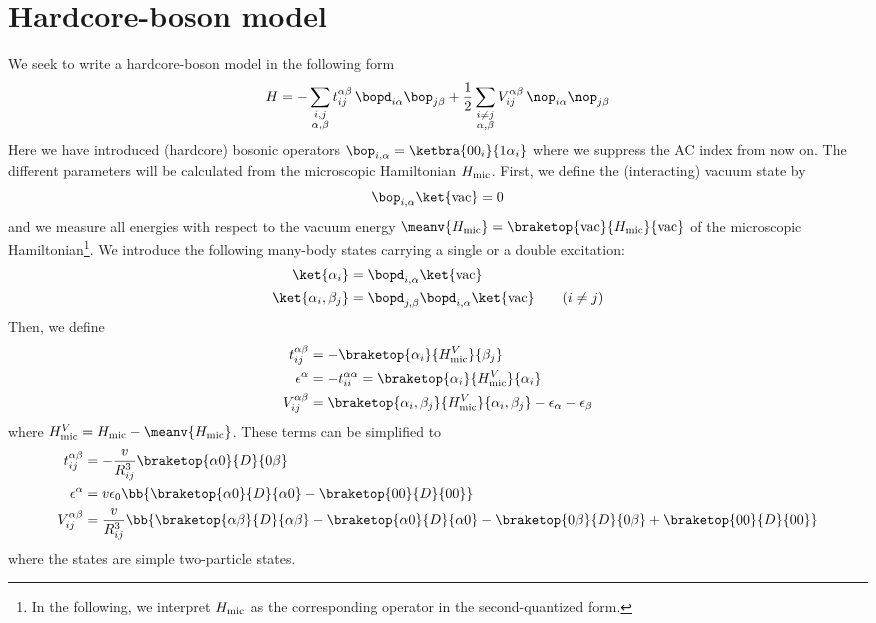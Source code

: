 \section{Hardcore-boson model}
We seek to write a hardcore-boson model in the following form
\begin{align}
    H=%
    - \sum_{\substack{i, j\\ \alpha,\beta}} t_{ij}^{\alpha\beta}\, \bopd_{i\alpha} \bop_{j\beta}
    + \frac{1}{2} \sum_{\substack{i\ne j\\ \alpha,\beta}} V_{ij}^{\alpha\beta}\,  \nop_{i\alpha} \nop_{j\beta}
\end{align}
Here we have introduced (hardcore) bosonic operators $\bop_{i,\alpha} =
\ketbra{00_i}{1\alpha_i}$ where we suppress the AC index from now on.
The different parameters will be calculated from the microscopic Hamiltonian $H_\text{mic}$.
First, we define the (interacting) vacuum state by
\begin{align}
    \bop_{i,\alpha}\ket{\text{vac}}=0
\end{align}
and we measure all energies with respect to the vacuum energy
$\meanv{\Hmic}=\braketop{\text{vac}}{\Hmic}{\text{vac}}$ of the
microscopic Hamiltonian\footnote{In the following, we interpret $H_\text{mic}$
as the corresponding operator in the second-quantized form.}. We
introduce the following many-body states carrying a single or a double
excitation:
\begin{align}
    \ket{\alpha_i} &= \bopd_{i,\alpha} \ket{\text{vac}} \\
    \ket{\alpha_i,\beta_j} &= \bopd_{j,\beta} \bopd_{i,\alpha} \ket{\text{vac}}\qquad (i\ne j)
\end{align}
Then, we define
\begin{align}
    t_{ij}^{\alpha\beta} &= - \braketop{\alpha_i}{\Hmic^V}{\beta_j} \\
    \epsilon^\alpha &= - t^{\alpha\alpha}_{ii} = \braketop{\alpha_i}{\Hmic^V}{\alpha_i} \\
    V_{ij}^{\alpha\beta} &= \braketop{\alpha_i,\beta_j}{\Hmic^V}{\alpha_i,\beta_j} - \epsilon_\alpha - \epsilon_\beta
\end{align}
where $\Hmic^V=\Hmic-\meanv{\Hmic}$. These terms can be simplified to
\begin{align}
    t_{ij}^{\alpha\beta} &= - \frac{v}{R_{ij}^3} \braketop{\alpha 0}{D}{0 \beta} \\
    \epsilon^\alpha &= v \epsilon_0 \bb{\braketop{\alpha 0}{D}{\alpha 0} - \braketop{0 0}{D}{0 0}} \\
    V_{ij}^{\alpha\beta} &= \frac{v}{R_{ij}^3} \bb{\braketop{\alpha \beta}{D}{\alpha \beta} - \braketop{\alpha 0}{D}{\alpha 0} - \braketop{0 \beta}{D}{0 \beta} + \braketop{0 0}{D}{0 0}}
\end{align}
where the states are simple two-particle states.

